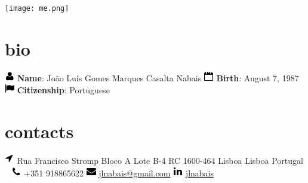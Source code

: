 \documentclass[]{friggeri-cv} %
\begin{document}


\begin{aside} %
\texttt{[image: me.png]} 
\section{bio}
\includegraphics[scale=0.5, left]{USER.png}
\vspace{-5mm} \textbf{Name}: João Luís Gomes Marques Casalta Nabais
\includegraphics[scale=0.5, left]{calendar.png}
\vspace{-5mm} \textbf{Birth}: August 7, 1987
\includegraphics[scale=0.5, left]{flag.png}
\vspace{-5mm} \textbf{Citizenship}: Portuguese
\section{contacts}
\includegraphics[scale=0.5, left]{location.png} 
\vspace{-5mm} Rua Francisco Stromp Bloco A Lote B-4 RC
 1600-464 Lisboa
Lisboa
Portugal
~
\includegraphics[scale=0.5, left]{phone.png} 
\vspace{-5mm} +351 918865622
\includegraphics[scale=0.5, left]{envelope.png}
\vspace{-5mm} \href{mailto:jlnabais@gmail.com}{jlnabais@gmail.com}
\includegraphics[scale=0.5, left]{linkedin.png} 
\vspace{-5mm} \href{http://www.linkedin.com/in/jlnabais}{jlnabais}

\end{aside}
\end{document}
